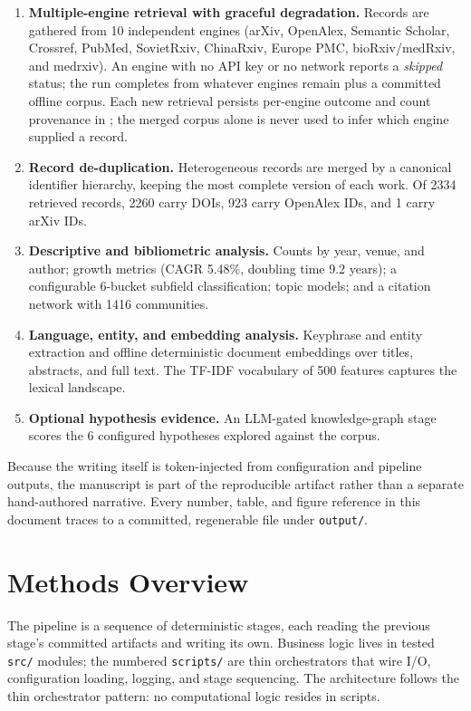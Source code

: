 \documentclass[
  english,
]{article}
\begin{document}
\begin{enumerate}
\def\labelenumi{\arabic{enumi}.}
\item
  \textbf{Multiple-engine retrieval with graceful degradation.} Records
  are gathered from 10 independent engines (arXiv, OpenAlex, Semantic
  Scholar, Crossref, PubMed, SovietRxiv, ChinaRxiv, Europe PMC,
  bioRxiv/medRxiv, and medrxiv). An engine with no API key or no network
  reports a \emph{skipped} status; the run completes from whatever
  engines remain plus a committed offline corpus. Each new retrieval
  persists per-engine outcome and count provenance in
  ; the merged corpus alone
  is never used to infer which engine supplied a record.
\item
  \textbf{Record de-duplication.} Heterogeneous records are merged by a
  canonical identifier hierarchy, keeping the most complete version of
  each work. Of 2334 retrieved records, 2260 carry DOIs, 923 carry
  OpenAlex IDs, and 1 carry arXiv IDs.
\item
  \textbf{Descriptive and bibliometric analysis.} Counts by year, venue,
  and author; growth metrics (CAGR 5.48\%, doubling time 9.2 years); a
  configurable 6-bucket subfield classification; topic models; and a
  citation network with 1416 communities.
\item
  \textbf{Language, entity, and embedding analysis.} Keyphrase and
  entity extraction and offline deterministic document embeddings over
  titles, abstracts, and full text. The TF-IDF vocabulary of 500
  features captures the lexical landscape.
\item
  \textbf{Optional hypothesis evidence.} An LLM-gated knowledge-graph
  stage scores the 6 configured hypotheses explored against the corpus.
\end{enumerate}

Because the writing itself is token-injected from configuration and
pipeline outputs, the manuscript is part of the reproducible artifact
rather than a separate hand-authored narrative. Every number, table, and
figure reference in this document traces to a committed, regenerable
file under \texttt{output/}.

\newpage

\section{Methods Overview}\label{methods-overview}

The pipeline is a sequence of deterministic stages, each reading the
previous stage's committed artifacts and writing its own. Business logic
lives in tested \texttt{src/} modules; the numbered \texttt{scripts/}
are thin orchestrators that wire I/O, configuration loading, logging,
and stage sequencing. The architecture follows the thin orchestrator
pattern: no computational logic resides in scripts.
\end{document}
